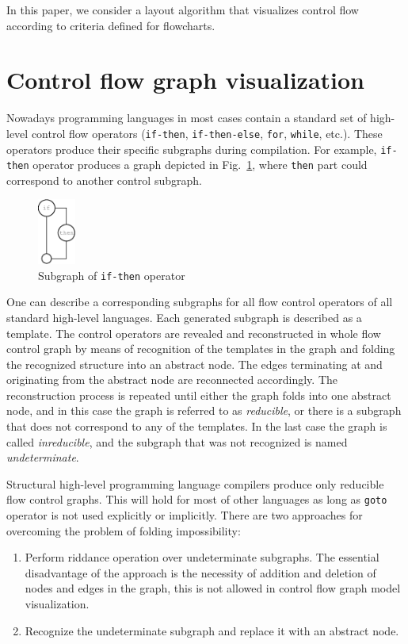 \documentclass[conference]{IEEEtran}
\begin{document}
In this paper, we consider a layout algorithm that visualizes control flow according to criteria defined for flowcharts.

\section{Control flow graph visualization}
\label{sec:cfg-vis}

Nowadays programming languages in most cases contain a standard set of high-level control flow operators (\texttt{if-then}, \texttt{if-then-else}, \texttt{for}, \texttt{while}, etc.).  These operators produce their specific subgraphs during compilation.  For example, \texttt{if-then} operator produces a graph depicted in Fig.~\ref{fig:IfSt}, where \texttt{then} part could correspond to another control subgraph.
\begin{figure}[htbp]
	\centering
		\includegraphics[width=0.11\textwidth]{Pic/Pic2.eps}
	\caption{Subgraph of \texttt{if-then} operator}
	\label{fig:IfSt}
\end{figure}

One can describe a corresponding subgraphs for all flow control operators of all standard high-level languages.  Each generated subgraph is described as a template.  The control operators are revealed and reconstructed in whole flow control graph by means of recognition of the templates in the graph and folding the recognized structure into an abstract node.  The edges terminating at and originating from the abstract node are reconnected accordingly.  The reconstruction process is repeated until either the graph folds into one abstract node, and in this case the graph is referred to as \emph{reducible}, or there is a subgraph that does not correspond to any of the templates.  In the last case the graph is called \emph{inreducible}, and the subgraph that was not recognized is named \emph{undeterminate}.

Structural high-level programming language compilers produce only reducible flow control graphs.  This will hold for most of other languages as long as \texttt{goto} operator is not used explicitly or implicitly.  There are two approaches for overcoming the problem of folding impossibility:
\begin{enumerate}
\item Perform riddance operation over undeterminate subgraphs.  The essential disadvantage of the approach is the necessity of addition and deletion of nodes and edges in the graph, this is not allowed in control flow graph model visualization.
\item Recognize the undeterminate subgraph and replace it with an abstract node.
\end{enumerate}
\end{document}
